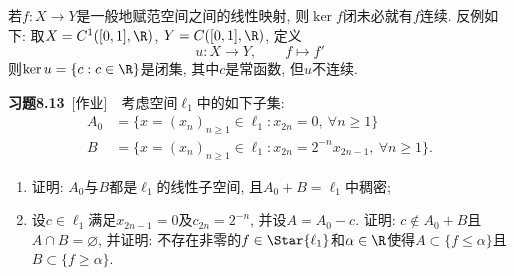 	\begin{remark}
	若$ f : X\to Y $是一般地赋范空间之间的线性映射, 则$ \ker f $闭未必就有$ f $连续. 反例如下: 取$ X=C^1([0,1],\R) $, $ Y=C([0,1],\R) $, 定义
	\[
	u : X\to Y ,\qquad f\mapsto f'
	\]
	则$ \ker u=\{ c : c\in\R \} $是闭集, 其中$ c $是常函数, 但$ u $不连续.
	\end{remark}

	\textbf{习题8.13}\ [作业]\ \ 考虑空间$ \ell_1 $中的如下子集:
	\[
	\begin{aligned}
	A_0&=\{ x=(x_n)_{n\geqslant 1}\in\ell_1 : x_{2n}=0,\ \forall n\geqslant 1 \}\\
	B&=\{ x=(x_n)_{n\geqslant 1}\in\ell_1 : x_{2n}=2^{-n}x_{2n-1},\ \forall n\geqslant 1 \}.
	\end{aligned}
	\]
	\begin{enumerate}
	\item 证明: $ A_0 $与$ B $都是$ \ell_1 $的线性子空间, 且$ A_0+B=\ell_1 $中稠密;
	\item 设$ c\in\ell_1 $满足$ x_{2n-1}=0 $及$ c_{2n}=2^{-n} $, 并设$ A=A_0-c $. 证明: $ c\notin A_0+B $且$ A\cap B=\varnothing $, 并证明: 不存在非零的$ f\in\Star{\ell_1} $和$ \alpha\in\R $使得$ A\subset\{ f\leqslant\alpha \} $且$ B\subset\{ f\geqslant\alpha \} $.
	\end{enumerate}
